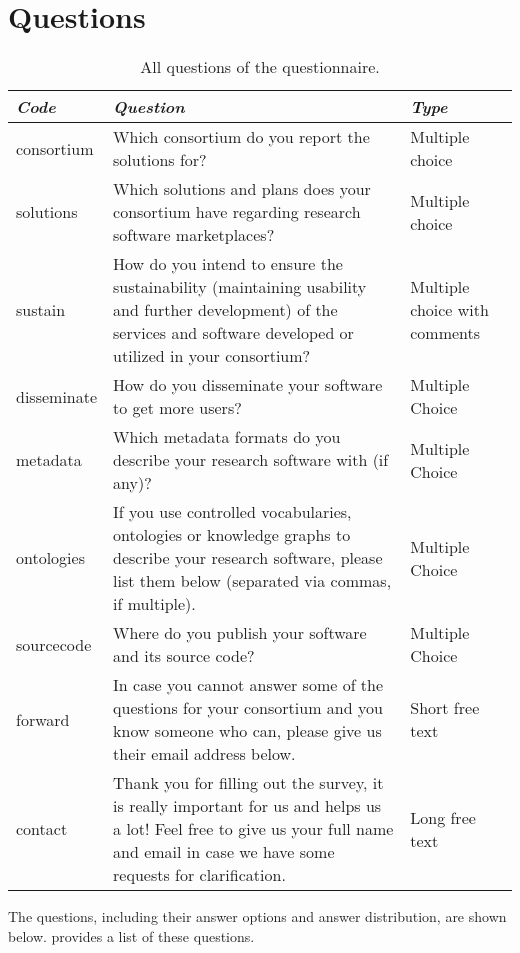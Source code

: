 \documentclass[headsepline,titlepage,twoside,12pt,toc=flat,headings=normal]{scrreprt}
\begin{document}
\chapter{Questions}
\begin{table}[ht!]
\begin{tabulary}{\textwidth}{lLL}
\toprule
\emph{Code}              &\emph{Question}   &\emph{Type}\\
\midrule
consortium        &Which consortium do you report the solutions for?    &Multiple choice\\
solutions         &Which solutions and plans does your consortium have regarding research software marketplaces?    &Multiple choice\\
sustain           &How do you intend to ensure the sustainability (maintaining usability and further development) of the services and software developed or utilized in your consortium?    &Multiple choice with comments\\
disseminate       &How do you disseminate your software to get more users?    &Multiple Choice\\
metadata          &Which metadata formats do you describe your research software with (if any)?    &Multiple Choice\\
ontologies        &If you use controlled vocabularies, ontologies or knowledge graphs to describe your research software, please list them below (separated via commas, if multiple).    &Multiple Choice\\
sourcecode        &Where do you publish your software and its source code?    &Multiple Choice\\
forward           &In case you cannot answer some of the questions for your consortium and you know someone who can, please give us their email address below.  &Short free text\\
contact           &Thank you for filling out the survey, it is really important for us and helps us a lot! Feel free to give us your full name and email in case we have some requests for clarification. &Long free text\\
\bottomrule
\end{tabulary}
\caption{All questions of the questionnaire.}
\label{tab:questions}
\end{table}

The questions, including their answer options and answer distribution, are shown below.
 provides a list of these questions.

\end{document}
